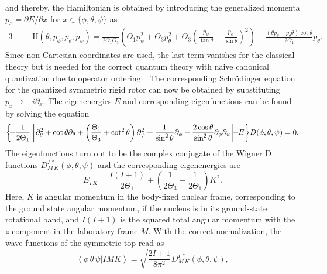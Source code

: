 and thereby, the Hamiltonian is obtained by introducing the generalized momenta $p_x=\partial E / \partial x$ for $x\in \{ \phi,\theta,\psi\}$ as
\begin{alignat}{3}
&&&\mathrm{H}(\theta,p_\phi,p_\theta,p_\psi)=\frac{1}{2\Theta_1 \Theta_3}\left( \Theta_1 p^2_\psi + \Theta_3 p^2_\theta + \Theta_3 \left( \frac{p_\psi}{\tan\theta} - \frac{p_\phi}{\sin\theta} \right)^2 \right)
-\frac{(\theta p_\theta - p_\theta \theta)\cot\theta }{2\Theta_1}p_\theta.
\end{alignat}
Since non-Cartesian coordinates are used, the last term vanishes for the classical theory but is needed for the correct quantum theory with naive canonical quantization due to operator ordering~\cite{podolsky1928}.
The corresponding Schrödinger equation for the quantized symmetric rigid rotor can now be obtained by substituting $p_x \rightarrow -i\partial_x$. The eigenenergies $E$ and corresponding eigenfunctions can be found by solving the equation~\cite{edmonds1960}
\begin{alignat}{2}
\left\{\hspace{-3pt}-\frac{1}{2\Theta_1}\left[ \partial^2_\theta + \cot\theta \partial_\theta+\left(\frac{\Theta_1}{\Theta_3}+\cot^2\theta\right)\partial_\psi^2+\frac{1}{\sin^2\theta}\partial_\phi-\frac{2\cos\theta}{\sin^2\theta}\partial_\phi\partial_\psi\right]\hspace{-5pt}-\hspace{-3pt}E\right\}\hspace{-2pt} D(\phi,\theta,\psi)=0.
\end{alignat}
The eigenfunctions turn out to be the complex conjugate of the Wigner D functions $D^{I\,*}_{M\,K}(\phi,\theta,\psi)$ and the corresponding eigenenergies are~\cite{kronig1927}
\begin{equation}
E_{I\,K}=\frac{I(I+1)}{2\Theta_1}+ \left(\frac{1}{2\Theta_3}-\frac{1}{2\Theta_1}\right)K^2.
\label{eq:rig_rotorEn}
\end{equation}
Here, $K$ is angular momentum in the body-fixed nuclear frame, corresponding to the ground state angular momentum, if the nucleus is in its ground-state rotational band, and $I(I+1)$ is the squared total angular momentum with the $z$ component in the laboratory frame $M$. With the correct normalization, the wave functions of the symmetric top read as
\begin{equation}
\label{app:rigidRot_state}
\left<\phi\,\theta\,\psi|IMK\right> = \sqrt{\frac{2I+1}{8\pi^2}}D^{I\,*}_{M\,K}(\phi,\theta,\psi),
\end{equation}
